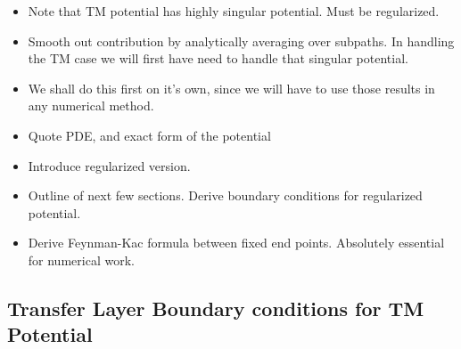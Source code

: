 \begin{itemize}
  \item {Note that TM potential has highly singular potential.  Must be regularized.}
  \item Smooth out contribution by analytically averaging over subpaths.
    In handling the TM case we will first have need to handle that singular potential.
  \item We shall do this first on it's own, since we will have to use those results in any numerical method.

  \item Quote PDE, and exact form of the potential
  \item Introduce regularized version.  
  \item Outline of next few sections.  Derive boundary conditions for regularized potential.  
  \item Derive Feynman-Kac formula between fixed end points.  Absolutely essential for numerical
    work.
\end{itemize}

\subsection{Transfer Layer Boundary conditions for TM Potential}

